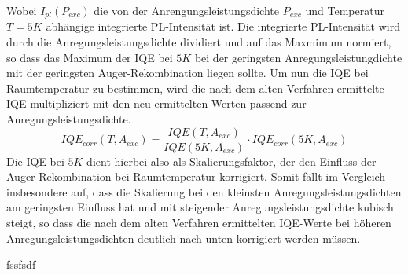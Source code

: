 \vspace{0.1cm}
\raggedright
%
Wobei $I_{pl}(P_{exc})$ die von der Anrengungsleistungsdichte $P_{exc}$ und Temperatur $T = 5K$ abhängige integrierte PL-Intensität ist. Die integrierte PL-Intensität wird durch die Anregungsleistungsdichte dividiert und auf das Maxmimum normiert, so dass das Maximum der IQE bei $5K$ bei der geringsten Anregungsleistungdichte mit der geringsten Auger-Rekombination liegen sollte. Um nun die IQE bei Raumtemperatur zu bestimmen, wird die nach dem alten Verfahren ermittelte IQE multipliziert mit den neu ermittelten Werten passend zur Anregungsleistungsdichte. 
%
\begin{equation}
    IQE_{corr}(T, A_{exc}) = \frac{IQE(T,A_{exc})}{IQE(5K,A_{exc})} \cdot IQE_{corr}(5K,A_{exc})
    \label{eq:iqetrue300k}
\end{equation}
%
Die IQE bei $5K$ dient hierbei also als Skalierungsfaktor, der den Einfluss der Auger-Rekombination bei Raumtemperatur korrigiert. Somit fällt im Vergleich insbesondere auf, dass die Skalierung bei den kleinsten Anregungsleistungsdichten am geringsten Einfluss hat und mit steigender Anregungsleistungsdichte kubisch steigt, so dass die nach dem alten Verfahren ermittelten IQE-Werte bei höheren Anregungsleistungsdichten deutlich nach unten korrigiert werden müssen. 

%
fssfsdf

